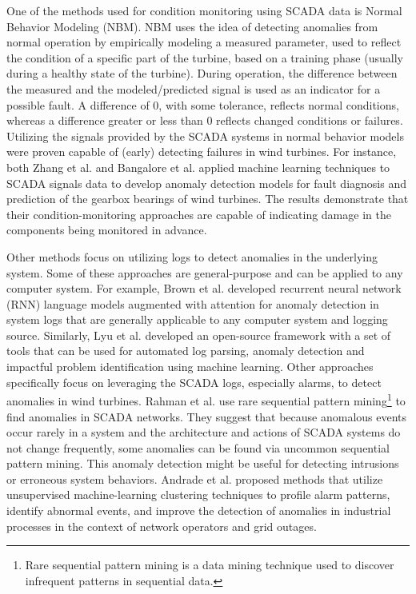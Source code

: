 \par One of the methods used for condition monitoring using SCADA data is Normal Behavior
Modeling (NBM). NBM uses the idea of detecting anomalies from normal operation by
empirically modeling a measured parameter, used to reflect the condition of a specific part of
the turbine, based on a training phase (usually during a healthy state of the turbine). During
operation, the difference between the measured and the modeled/predicted signal is used as an
indicator for a possible fault. A difference of 0, with some tolerance, reflects normal conditions,
whereas a difference greater or less than 0 reflects changed conditions or failures. Utilizing the signals provided 
by the SCADA systems in normal behavior models were proven capable of (early) detecting failures in wind turbines.
For instance, both Zhang et al. \cite{Zhang_Wang} and Bangalore et al. \cite{Bangalore_1} applied machine learning techniques to SCADA signals data to develop anomaly detection models 
for fault diagnosis and prediction of the gearbox bearings of wind turbines. 
The results demonstrate that their condition-monitoring approaches are capable of indicating damage in the components being monitored in advance.

\par Other methods focus on utilizing logs to detect anomalies in the underlying system. Some of these approaches are general-purpose 
and can be applied to any computer system. For example, Brown et al. \cite{RNN} developed recurrent neural network (RNN) language models augmented with attention 
for anomaly detection in system logs that are generally applicable to any computer system and logging source. 
Similarly, Lyu et al. \cite{LogPAI} developed an open-source framework with a set of tools that can be used for automated log parsing, 
anomaly detection and impactful problem identification using machine learning.
Other approaches specifically focus on leveraging the SCADA logs, especially alarms, to detect anomalies in wind turbines.
Rahman et al. \cite{sequence} use rare sequential pattern mining\footnote{Rare sequential pattern mining is a data mining technique used to discover infrequent patterns in sequential data.} 
to find anomalies in SCADA networks. 
They suggest that because anomalous events occur rarely in a system and the architecture and actions of SCADA systems do not change frequently, 
some anomalies can be found via uncommon sequential pattern mining. This anomaly detection might be useful for detecting intrusions or erroneous system behaviors.
Andrade et al. \cite{Cluster} proposed methods that utilize unsupervised machine-learning clustering techniques to profile alarm patterns, identify abnormal events, and improve the detection of anomalies in 
industrial processes in the context of network operators and grid outages.


